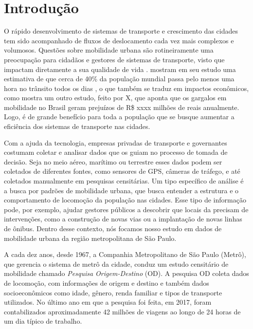 \chapter{Introdução}
\label{cap:introducao}

O rápido  desenvolvimento de sistemas de transporte e crescimento das cidades
tem sido acompanhado de fluxos de deslocamento cada vez mais complexos e
volumosos. Questões sobre mobilidade urbana são rotineiramente uma preocupação para cidadãos e
gestores de sistemas de transporte, visto que impactam diretamente a sua
qualidade de vida . \cite{Zhang2011} mostram em seu
estudo uma estimativa de que cerca de 40\% da
população mundial passa pelo menos uma hora no trânsito todos os dias
\citep{Zhang2011}, o que também se traduz em impactos econômicos, como mostra um outro
estudo, feito por X, que aponta que os gargalos em mobilidade no Brasil geram prejuízos  de R\$ xxxx
milhões de reais anualmente. Logo, é de grande benefício para toda a população que
se busque aumentar a eficiência dos sistemas de transporte nas cidades.

Com a ajuda da tecnologia, empresas privadas de transporte e governantes
costumam coletar e analisar dados que os guiam no processo de tomada de
decisão. Seja no meio aéreo, marítimo ou terrestre esses dados podem ser
coletados de diferentes fontes, como sensores de GPS, câmeras de tráfego, e até
coletados manualmente em pesquisas censitárias. Um tipo específico de análise é
a busca por padrões de mobilidade urbana, que busca entender a estrutura e o
comportamento de locomoção da população nas cidades.  Esse tipo de informação
pode, por exemplo, ajudar gestores públicos a descobrir que locais da precisam
de intervenções, como a construção de novas vias ou a implantação de novas
linhas de ônibus. Dentro desse contexto, nós focamos nosso estudo em dados de
mobilidade urbana da região metropolitana de S\~ao Paulo.

A cada dez anos, desde 1967, a Companhia Metropolitano de São Paulo (Metrô),
que gerencia o sistema de metrô da cidade, conduz um estudo censitário de
mobilidade chamado \emph{Pesquisa Origem-Destino} (OD). A pesquisa OD coleta
dados de locomoção, com informações de origem e destino e também dados
socioeconômicos como idade, gênero, renda familiar e tipos de transporte
utilizados. No último ano em que a pesquisa foi feita, em 2017, foram
contabilizados aproximadamente 42 milhões de viagens ao longo de 24 horas de um
dia típico de trabalho.

